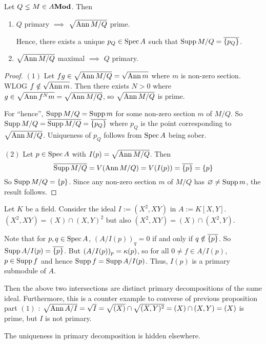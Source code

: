 \begin{prop}

  Let $Q \lneq M \in A\mathbf{Mod}$.
  Then 
  \begin{enumerate}
    \item $Q$ primary $\implies$ $\sqrt{\operatorname{Ann} M/Q}$ prime.
     
    Hence, there exists a unique $p_Q \in \operatorname{Spec} A$ such that 
    $\operatorname{Supp} M/Q = \overline{\left\{p_Q\right\}}$.
    \item $\sqrt{\operatorname{Ann} M/Q}$ maximal $\implies$ $Q$ primary.
  \end{enumerate}
\end{prop}
\begin{proof}
  $(1)$ 
  Let $f g \in \sqrt{\operatorname{Ann} M/Q} = \sqrt{\operatorname{Ann} m}$ where $m$ is non-zero section.
  WLOG $f \notin \sqrt{\operatorname{Ann} m}$. Then there exists $N > 0$
  where $g \in \sqrt{\operatorname{Ann} f^N m} = \sqrt{\operatorname{Ann} M/Q}$,
  so $\sqrt{\operatorname{Ann} M/Q}$ is prime. 

  For ``hence'', $\operatorname{Supp} M/Q = \operatorname{Supp} m$ for some non-zero section $m$ of $M/Q$.
  So $\operatorname{Supp} M/Q = \overline{\operatorname{Supp} M/Q} = \overline{\left\{p_Q\right\}}$ where 
  $p_Q$ is the point corresponding to $\sqrt{\operatorname{Ann} M/Q}$. 
  Uniqueness of $p_Q$ follows from $\operatorname{Spec} A$ being sober. 

  $(2)$
  Let $p \in \operatorname{Spec} A$ with $I(p) = \sqrt{\operatorname{Ann} M/Q}$.
  Then 
  \[
    \overline{\operatorname{Supp} M/Q} = V(\operatorname{Ann} M/Q) = V(I(p)) = \overline{\left\{p\right\}} = \left\{p\right\}
  \]
  So $\operatorname{Supp} M/Q = \left\{p\right\}$.
  Since any non-zero section $m$ of $M/Q$ has $\varnothing \neq \operatorname{Supp} m$,
  the result follows. 

\end{proof}

\begin{eg}

  Let $K$ be a field.
  Consider the ideal $I := (X^2,XY)$ in $A := K[X,Y]$.
  $(X^2,XY) = (X) \cap (X,Y)^2$ but also $(X^2, XY) = (X) \cap (X^2, Y)$.
  
  Note that for $p, q\in \operatorname{Spec} A$,
  $(A/I(p))_q = 0$ if and only if $q \notin \overline{\left\{p\right\}}$.
  So $\operatorname{Supp} A/I(p) = \overline{\left\{p\right\}}$. 
  But $(A/I(p))_p = \kappa(p)$, so for all $0 \neq f \in A/I(p)$,
  $p \in \operatorname{Supp} f$ and hence $\operatorname{Supp} f = \operatorname{Supp} A/I(p)$.
  Thus, $I(p)$ is a primary submodule of $A$.

  Then the above two intersections are distinct primary decompositions 
  of the same ideal. 
  Furthermore, this is a counter example to 
  converse of previous proposition part $(1)$ : 
  $\sqrt{\operatorname{Ann} A/I} = \sqrt{I}= \sqrt{(X)} \cap \sqrt{(X,Y)^2}
  = (X) \cap (X,Y) = (X)$ is prime, but $I$ is not primary. 

  The uniqueness in primary decomposition is hidden elsewhere.
\end{eg}

